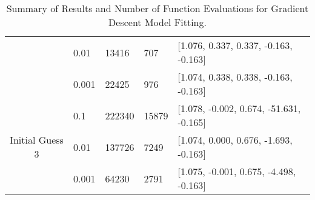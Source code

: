\documentclass{article}
\begin{document}
\begin{table}[]
\begin{tabular}{@{}cllll@{}}
                                                & 0.01                                                                     & 13416                                                                       & 707                                                                         & {[}1.076, 0.337, 0.337, -0.163, -0.163{]}                                                                      \\
                                                & 0.001                                                                    & 22425                                                                       & 976                                                                         & {[}1.074, 0.338, 0.338, -0.163, -0.163{]}                                                                      \\
        \multirow{3}{*}{Initial Guess 3}           & 0.1                                                                      & 222340                                                                      & 15879                                                                       & {[}1.078, -0.002, 0.674, -51.631, -0.165{]}                                                                    \\
                                                & 0.01                                                                     & 137726                                                                      & 7249                                                                        & {[}1.074, 0.000, 0.676, -1.693, -0.163{]}                                                                      \\
                                                & 0.001                                                                    & 64230                                                                       & 2791                                                                        & {[}1.075, -0.001, 0.675, -4.498, -0.163{]}                                                                     \\ \cmidrule(l){2-5} 
        \end{tabular}
        \caption{Summary of Results and Number of Function Evaluations for Gradient Descent Model Fitting.}
        \label{tab:Q3_Table_Summary}
    \end{table}
\end{document}
